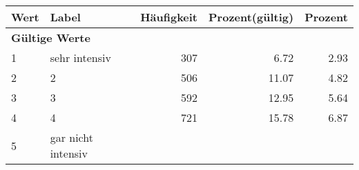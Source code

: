      \begin{longtable}{lXrrr}
     \toprule
     \textbf{Wert} & \textbf{Label} & \textbf{Häufigkeit} & \textbf{Prozent(gültig)} & \textbf{Prozent} \\
     \endhead
     \midrule
     \multicolumn{5}{l}{\textbf{Gültige Werte}}\\

     1 &
     \multicolumn{1}{X}{ sehr intensiv   } &


       \num{307} &
       \num[round-mode=places,round-precision=2]{6,72} &
         \num[round-mode=places,round-precision=2]{2,93} \\

     2 &
     \multicolumn{1}{X}{ 2   } &


       \num{506} &
       \num[round-mode=places,round-precision=2]{11,07} &
         \num[round-mode=places,round-precision=2]{4,82} \\

     3 &
     \multicolumn{1}{X}{ 3   } &


       \num{592} &
       \num[round-mode=places,round-precision=2]{12,95} &
         \num[round-mode=places,round-precision=2]{5,64} \\

     4 &
     \multicolumn{1}{X}{ 4   } &


       \num{721} &
       \num[round-mode=places,round-precision=2]{15,78} &
         \num[round-mode=places,round-precision=2]{6,87} \\

     5 &
     \multicolumn{1}{X}{ gar nicht intensiv   } &



\end{longtable}
